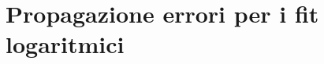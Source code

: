 \documentclass[@SRC@/main]{subfiles}
\begin{document}
\section{Propagazione errori per i fit logaritmici}
\label{sec:propagazione-errori-log}
\end{document}
